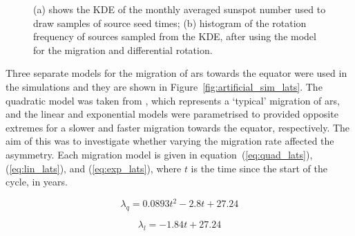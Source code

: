 \begin{figure}[ht!]
	\centering
	\qquad
	\caption{(a) shows the KDE of the monthly averaged sunspot number used to draw samples of source seed times; (b) histogram of the rotation frequency of sources sampled from the KDE, after using the model for the migration and differential rotation.} 
	\label{fig:KDE_lats}
\end{figure}

Three separate models for the migration of \glspl{ar} towards the equator were used in the simulations and they are shown in Figure~\ref{fig:artificial_sim_lats}. The quadratic model was taken from \citet{li_latitude_2001}, which represents a `typical' migration of \glspl{ar}, and the linear and exponential models were parametrised to provided opposite extremes for a slower and faster migration towards the equator, respectively. The aim of this was to investigate whether varying the migration rate affected the asymmetry. Each migration model is given in equation~(\ref{eq:quad_lats}), (\ref{eq:lin_lats}), and (\ref{eq:exp_lats}), where $t$ is the time since the start of the cycle, in years.

\begin{equation}
\lambda_{q} = 0.0893t^2 - 2.8t + 27.24
\label{eq:quad_lats}
\end{equation}

\begin{equation}
\lambda_{l} = -1.84t + 27.24
\label{eq:lin_lats}
\end{equation}

